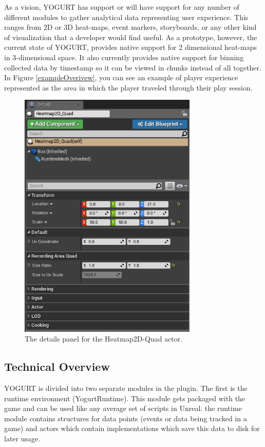 \documentclass[journal]{IEEEtran}
\begin{document}
As a vision, YOGURT has support or will have support for any number of different modules to gather analytical data representing user experience. This ranges from 2D or 3D heat-maps, event markers, storyboards, or any other kind of visualization that a developer would find useful. As a prototype, however, the current state of YOGURT, provides native support for 2 dimensional heat-maps in 3-dimensional space. It also currently provides native support for binning collected data by timestamp so it can be viewed in chunks instead of all together. In Figure \ref{exampleOverivew}, you can see an example of player experience represented as the area in which the player traveled through their play session.

\begin{figure}[h]
\includegraphics[width=8.5cm]{"scene_quad_details"}
\caption{The details panel for the Heatmap2D-Quad actor.}
\label{sceneQuadDetails}
\end{figure}

\subsection{Technical Overview}

YOGURT is divided into two separate modules in the plugin. The first is the runtime environment (YogurtRuntime). This module gets packaged with the game and can be used like any average set of scripts in Unreal. the runtime module contains structures for data points (events or data being tracked in a game) and actors which contain implementations which save this data to disk for later usage.
\end{document}

